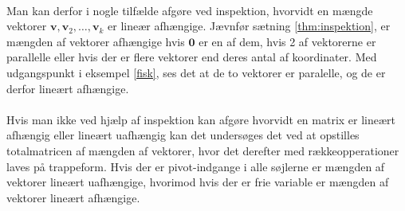 \\
%
%
Man kan derfor i nogle tilfælde afgøre ved inspektion, hvorvidt en mængde vektorer $\mathbf{v},\mathbf{v}_2,\ldots ,\mathbf{v}_k$ er lineær afhængige. 
Jævnfør sætning \ref{thm:inspektion}, er mængden af vektorer afhængige hvis $\mathbf{0}$ er en af dem, hvis 2 af vektorerne er parallelle eller hvis der er flere vektorer end deres antal af koordinater. 
Med udgangspunkt i eksempel \ref{fisk}, ses det at de to vektorer er paralelle, og de er derfor lineært afhængige. 
\\\\
Hvis man ikke ved hjælp af inspektion kan afgøre hvorvidt en matrix er lineært afhængig eller lineært uafhængig kan det undersøges det ved at opstilles totalmatricen af mængden af vektorer, hvor det derefter med rækkeopperationer laves på trappeform. 
Hvis der er pivot-indgange i alle søjlerne er mængden af vektorer lineært uafhængige, hvorimod hvis der er frie variable er mængden af vektorer lineært afhængige.
\\\\
%

